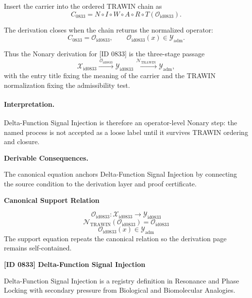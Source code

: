 Insert the carrier into the ordered TRAWIN chain as\[
C_{0833}=N\circ I\circ W\circ A\circ R\circ T(\mathcal{O}_{\mathrm{id0833}}).
\]

The derivation closes when the chain returns the normalized operator:\[
C_{0833}=\mathcal{O}_{\mathrm{id0833}},\qquad \mathcal{O}_{\mathrm{id0833}}(x)\in\mathcal{Y}_{\mathrm{adm}}.
\]

Thus the Nonary derivation for [ID 0833] is the three-stage passage
\[
\mathcal{X}_{\mathrm{id0833}}\xrightarrow{\,\mathcal{O}_{\mathrm{id0833}}\,} \mathcal{Y}_{\mathrm{id0833}}\xrightarrow{\,\mathcal{N}_{\mathrm{TRAWIN}}\,} \mathcal{Y}_{\mathrm{adm}},
\]
with the entry title fixing the meaning of the carrier and the TRAWIN normalization fixing the admissibility test.

\paragraph{Interpretation.} Delta-Function Signal Injection is therefore an operator-level Nonary step: the named process is not accepted as a loose label until it survives TRAWIN ordering and closure.

\par\vspace{0.35em}
\noindent\textbf{Derivable Consequences.}\quad
\begingroup
\footnotesize
\raggedright
The canonical equation anchors Delta-Function Signal Injection by connecting the source condition to the derivation layer and proof certificate.
\par\endgroup

\noindent\textbf{Canonical Support Relation}\par
\[
\mathcal{O}_{\mathrm{id0833}}:\mathcal{X}_{\mathrm{id0833}}\longrightarrow\mathcal{Y}_{\mathrm{id0833}}
\]
\[
\mathcal{N}_{\mathrm{TRAWIN}}(\mathcal{O}_{\mathrm{id0833}})=\mathcal{O}_{\mathrm{id0833}}
\]
\[
\mathcal{O}_{\mathrm{id0833}}(x)\in\mathcal{Y}_{\mathrm{adm}}
\]
\noindent The support equation repeats the canonical relation so the derivation page remains self-contained.\par

\clearpage
\noindent\textbf{[ID 0833] Delta-Function Signal Injection}\par
\vspace{0.35em}
\begingroup\small
{}
Delta-Function Signal Injection is a registry definition in Resonance and Phase Locking with secondary pressure from Biological and Biomolecular Analogies.

